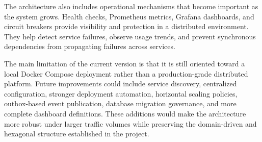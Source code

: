 \documentclass[12pt,a4paper]{article}
\begin{document}
The architecture also includes operational mechanisms that become important as the system grows. Health checks, Prometheus metrics, Grafana dashboards, and circuit breakers provide visibility and protection in a distributed environment. They help detect service failures, observe usage trends, and prevent synchronous dependencies from propagating failures across services.

The main limitation of the current version is that it is still oriented toward a local Docker Compose deployment rather than a production-grade distributed platform. Future improvements could include service discovery, centralized configuration, stronger deployment automation, horizontal scaling policies, outbox-based event publication, database migration governance, and more complete dashboard definitions. These additions would make the architecture more robust under larger traffic volumes while preserving the domain-driven and hexagonal structure established in the project.
\end{document}
